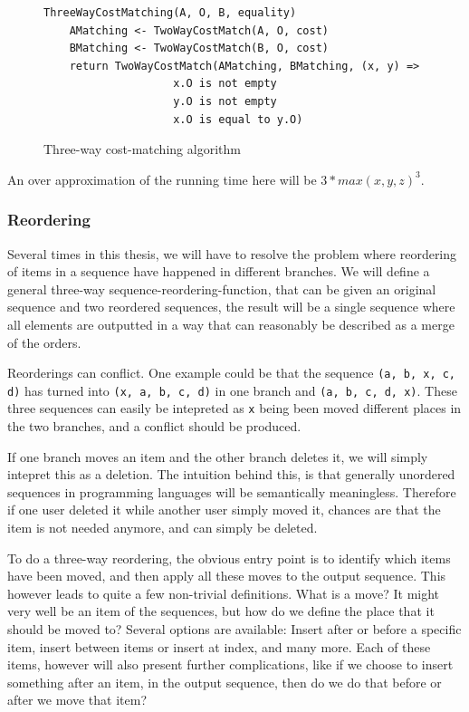 \documentclass[11pt]{article}
\begin{document}
\begin{figure}
\begin{verbatim}
ThreeWayCostMatching(A, O, B, equality)
    AMatching <- TwoWayCostMatch(A, O, cost)
    BMatching <- TwoWayCostMatch(B, O, cost)
    return TwoWayCostMatch(AMatching, BMatching, (x, y) =>
                    x.O is not empty
                    y.O is not empty
                    x.O is equal to y.O)
\end{verbatim}
\caption{Three-way cost-matching algorithm}
  \label{ThreeWayCostMatchingAlgorithm}
\end{figure}

An over approximation of the running time here will be  $3*max(x, y, z)^3$.


\subsubsection{Reordering}
Several times in this thesis, we will have to resolve the problem where reordering of items in a sequence have happened in different branches. We will define a general three-way sequence-reordering-function, that can be given an original sequence and two reordered sequences, the result will be a single sequence where all elements are outputted in a way that can reasonably be described as a merge of the orders.

Reorderings can conflict. One example could be that the sequence \texttt{(a, b, x, c, d)} has turned into \texttt{(x, a, b, c, d)} in one branch and \texttt{(a, b, c, d, x)}. These three sequences can easily be intepreted as \texttt{x} being been moved different places in the two branches, and a conflict should be produced.

If one branch moves an item and the other branch deletes it, we will simply intepret this as a deletion. The intuition behind this, is that generally unordered sequences in programming languages will be semantically meaningless. Therefore if one user deleted it while another user simply moved it, chances are that the item is not needed anymore, and can simply be deleted.

To do a three-way reordering, the obvious entry point is to identify which items have been moved, and then apply all these moves to the output sequence. This however leads to quite a few non-trivial definitions. What is a move? It might very well be an item of the sequences, but how do we define the place that it should be moved to? Several options are available: Insert after or before a specific item, insert between items or insert at index, and many more. Each of these items, however will also present further complications, like if we choose to insert something after an item, in the output sequence, then do we do that before or after we move that item?
\end{document}

